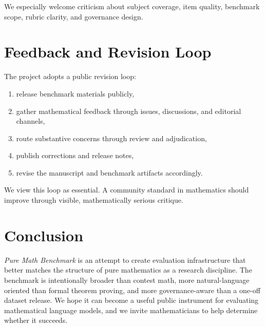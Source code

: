 \documentclass[11pt]{article}
\begin{document}
We especially welcome criticism about subject coverage, item quality, benchmark scope, rubric clarity, and governance design.

\section{Feedback and Revision Loop}

The project adopts a public revision loop:
\begin{enumerate}[leftmargin=*]
  \item release benchmark materials publicly,
  \item gather mathematical feedback through issues, discussions, and editorial channels,
  \item route substantive concerns through review and adjudication,
  \item publish corrections and release notes,
  \item revise the manuscript and benchmark artifacts accordingly.
\end{enumerate}

We view this loop as essential. A community standard in mathematics should improve through visible, mathematically serious critique.

\section{Conclusion}

\emph{Pure Math Benchmark} is an attempt to create evaluation infrastructure that better matches the structure of pure mathematics as a research discipline. The benchmark is intentionally broader than contest math, more natural-language oriented than formal theorem proving, and more governance-aware than a one-off dataset release. We hope it can become a useful public instrument for evaluating mathematical language models, and we invite mathematicians to help determine whether it succeeds.



\end{document}
